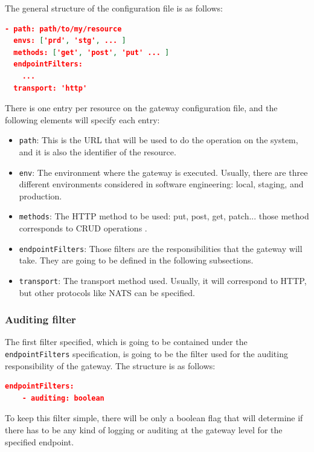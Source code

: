 \documentclass[english, 12pt, a4paper, sci, utf8, a-1b, online]{aaltothesis}
\begin{document}
The general structure of the configuration file is as follows: \\

\clearpage

\begin{lstlisting}[language=json,firstnumber=1]
- path: path/to/my/resource
  envs: ['prd', 'stg', ... ]
  methods: ['get', 'post', 'put' ... ]
  endpointFilters:
    ...
  transport: 'http'
\end{lstlisting}

There is one entry per resource on the gateway configuration file, and the following elements will specify each entry:

\begin{itemize}
    \item \texttt{path}: This is the URL that will be used to do the operation on the system, and it is also the identifier of the resource.
    \item \texttt{env}: The environment where the gateway is executed. Usually, there are three different environments considered in software engineering: local, staging, and production.
    \item \texttt{methods}: The HTTP method to be used: put, post, get, patch... those method corresponds to CRUD operations \cite{martin1983managing}.
    \item \texttt{endpointFilters}: Those filters are the responsibilities that the gateway will take. They are going to be defined in the following subsections.
    \item \texttt{transport}: The transport method used. Usually, it will correspond to HTTP, but other protocols like NATS can be specified.
\end{itemize}

\subsubsection*{Auditing filter}

The first filter specified, which is going to be contained under the \texttt{endpointFilters} specification, is going to be the filter used for the auditing responsibility of the gateway. The structure is as follows:\\

\begin{lstlisting}[language=json,firstnumber=1]
  endpointFilters:
    - auditing: boolean
\end{lstlisting}

To keep this filter simple, there will be only a boolean flag that will determine if there has to be any kind of logging or auditing at the gateway level for the specified endpoint.
\end{document}
